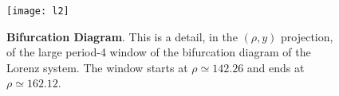 \begin{figure}
 \centering
 \texttt{[image: l2]}
 \caption{{\bf Bifurcation Diagram}. This is a detail, in the $(\rho,y)$ projection, of the large period-4 window of the bifurcation diagram of the Lorenz system. The window starts at $\rho\simeq142.26$ and ends at $\rho\simeq162.12$.}
 \label{fig:l2}
\end{figure} 